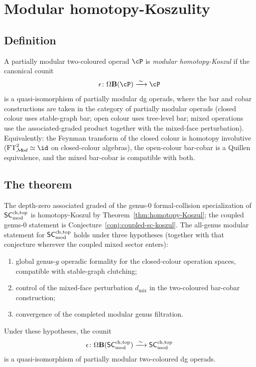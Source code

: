 \section{Modular homotopy-Koszulity}
\label{sec:modular-homotopy-koszulity}

\subsection{Definition}
\label{subsec:mod-hkoszul-def}

\begin{definition}
\label{def:modular-hkoszul}
A partially modular two-coloured operad $\cP$ is \emph{modular
homotopy-Koszul} if the canonical counit
\[
 \epsilon \colon \Omega\mathbf{B}(\cP) \xrightarrow{\;\sim\;} \cP
\]
is a quasi-isomorphism of partially modular dg operads, where the bar
and cobar constructions are taken in the category of partially modular
operads (closed colour uses stable-graph bar; open colour uses
tree-level bar; mixed operations use the associated-graded product
together with the mixed-face perturbation).
Equivalently: the Feynman transform of the closed colour is homotopy
involutive ($\FTmod^2 \simeq \id$ on closed-colour algebras), the
open-colour bar-cobar is a Quillen equivalence, and the mixed bar-cobar
is compatible with both.
\end{definition}


\subsection{The theorem}
\label{subsec:mod-hkoszul-thm}

\begin{theorem}
\label{thm:modular-hkoszul-SC}
The depth-zero associated graded of the genus-$0$
formal-collision specialization of $\mathsf{SC}^{\mathrm{ch,top}}_{\mathrm{mod}}$ is
homotopy-Koszul by Theorem~\ref{thm:homotopy-Koszul}; the coupled
genus-$0$ statement is Conjecture~\ref{conj:coupled-sc-koszul}. The
all-genus modular statement for $\mathsf{SC}^{\mathrm{ch,top}}_{\mathrm{mod}}$ holds under three
hypotheses (together with that conjecture wherever the coupled
mixed sector enters):
\begin{enumerate}[label=\textup{(\roman*)}]
\item global genus-$g$ operadic formality for the closed-colour
 operation spaces, compatible with stable-graph clutching;
\item control of the mixed-face perturbation $d_{\mathrm{mix}}$
 in the two-coloured bar-cobar construction;
\item convergence of the completed modular genus filtration.
\end{enumerate}
Under these hypotheses, the counit
\[
 \epsilon \colon
 \Omega\mathbf{B}(\mathsf{SC}^{\mathrm{ch,top}}_{\mathrm{mod}}) \xrightarrow{\;\sim\;} \mathsf{SC}^{\mathrm{ch,top}}_{\mathrm{mod}}
\]
is a quasi-isomorphism of partially modular two-coloured dg operads.
\end{theorem}

